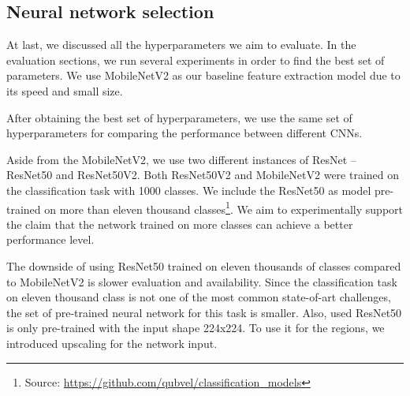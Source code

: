 
\subsection{Neural network selection}

At last, we discussed all the hyperparameters we aim to evaluate. In the evaluation sections, we run several experiments in order to find the best set of parameters. We use MobileNetV2 as our baseline feature extraction model due to its speed and small size.

After obtaining the best set of hyperparameters, we use the same set of hyperparameters for comparing the performance between different CNNs.

Aside from the MobileNetV2, we use two different instances of ResNet -- ResNet50 and ResNet50V2. Both ResNet50V2 and MobileNetV2 were trained on the classification task with 1000 classes. We include the ResNet50 as model pre-trained on more than eleven thousand classes\footnote{Source: \url{https://github.com/qubvel/classification\_models}}. We aim to experimentally support the claim that the network trained on more classes can achieve a better performance level. 

The downside of using ResNet50 trained on eleven thousands of classes compared to MobileNetV2 is slower evaluation and availability. Since the classification task on eleven thousand class is not one of the most common state-of-art challenges, the set of pre-trained neural network for this task is smaller. Also, used ResNet50 is only pre-trained with the input shape 224x224. To use it for the regions, we introduced upscaling for the network input. 





